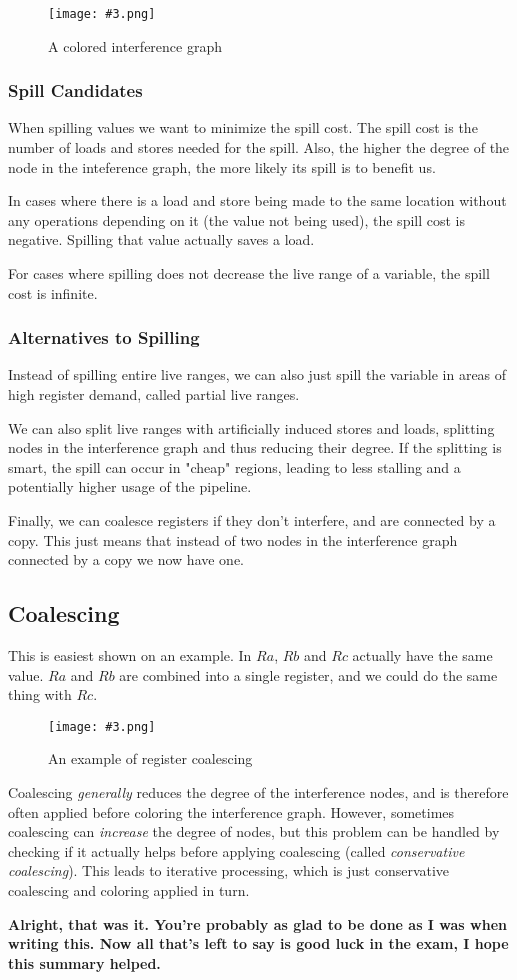 \documentclass{article}
\newcommand{\fig}[4]{
	\begin{figure}[#1]
		\center
		\texttt{[image: \#3.png]}
		\caption{#4}
		\label{fig:#3}
	\end{figure}
	}
\begin{document}
\fig{h}{0.6}{coloring}{A colored interference graph}

\subsubsection{Spill Candidates}
When spilling values we want to minimize the spill cost.
The spill cost is the number of loads and stores needed for the spill.
Also, the higher the degree of the node in the inteference graph, the more likely its spill is to benefit us.

In cases where there is a load and store being made to the same location without any operations depending on it (the value not being used), the spill cost is negative.
Spilling that value actually saves a load.

For cases where spilling does not decrease the live range of a variable, the spill cost is infinite.

\subsubsection{Alternatives to Spilling}
Instead of spilling entire live ranges, we can also just spill the variable in areas of high register demand, called partial live ranges.

We can also split live ranges with artificially induced stores and loads, splitting nodes in the interference graph and thus reducing their degree.
If the splitting is smart, the spill can occur in "cheap" regions, leading to less stalling and a potentially higher usage of the pipeline.

Finally, we can coalesce registers if they don't interfere, and are connected by a copy.
This just means that instead of two nodes in the interference graph connected by a copy we now have one.

\subsection{Coalescing}
This is easiest shown on an example.
In  $Ra$, $Rb$ and $Rc$ actually have the same value.
$Ra$ and $Rb$ are combined into a single register, and we could do the same thing with $Rc$.

\fig{h}{0.7}{coalescing}{An example of register coalescing}

Coalescing \emph{generally} reduces the degree of the interference nodes, and is therefore often applied before coloring the interference graph.
However, sometimes coalescing can \emph{increase} the degree of nodes, but this problem can be handled by checking if it actually helps before applying coalescing (called \emph{conservative coalescing}).
This leads to iterative processing, which is just conservative coalescing and coloring applied in turn.

\textbf{Alright, that was it. You're probably as glad to be done as I was when writing this.
Now all that's left to say is good luck in the exam, I hope this summary helped.}
\end{document}
